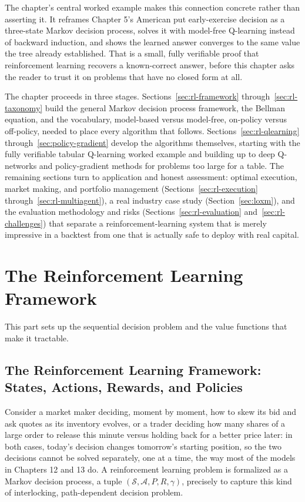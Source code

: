\documentclass[../ai_in_finance]{subfiles}
\begin{document}
The chapter's central worked example makes this connection concrete rather than asserting it. It reframes Chapter 5's American put early-exercise decision as a three-state Markov decision process, solves it with model-free Q-learning instead of backward induction, and shows the learned answer converges to the same value the tree already established. That is a small, fully verifiable proof that reinforcement learning recovers a known-correct answer, before this chapter asks the reader to trust it on problems that have no closed form at all.

The chapter proceeds in three stages. Sections~\ref{sec:rl-framework} through~\ref{sec:rl-taxonomy} build the general Markov decision process framework, the Bellman equation, and the vocabulary, model-based versus model-free, on-policy versus off-policy, needed to place every algorithm that follows. Sections~\ref{sec:rl-qlearning} through~\ref{sec:policy-gradient} develop the algorithms themselves, starting with the fully verifiable tabular Q-learning worked example and building up to deep Q-networks and policy-gradient methods for problems too large for a table. The remaining sections turn to application and honest assessment: optimal execution, market making, and portfolio management (Sections~\ref{sec:rl-execution} through~\ref{sec:rl-multiagent}), a real industry case study (Section~\ref{sec:loxm}), and the evaluation methodology and risks (Sections~\ref{sec:rl-evaluation} and~\ref{sec:rl-challenges}) that separate a reinforcement-learning system that is merely impressive in a backtest from one that is actually safe to deploy with real capital.

\section{The Reinforcement Learning Framework}

This part sets up the sequential decision problem and the value functions that make it tractable.

\subsection{The Reinforcement Learning Framework: States, Actions, Rewards, and Policies}
\label{sec:rl-framework}

Consider a market maker deciding, moment by moment, how to skew its bid and ask quotes as its inventory evolves, or a trader deciding how many shares of a large order to release this minute versus holding back for a better price later: in both cases, today's decision changes tomorrow's starting position, so the two decisions cannot be solved separately, one at a time, the way most of the models in Chapters 12 and 13 do. A reinforcement learning problem is formalized as a Markov decision process, a tuple $(\mathcal{S}, \mathcal{A}, P, R, \gamma)$, precisely to capture this kind of interlocking, path-dependent decision problem.
\end{document}
